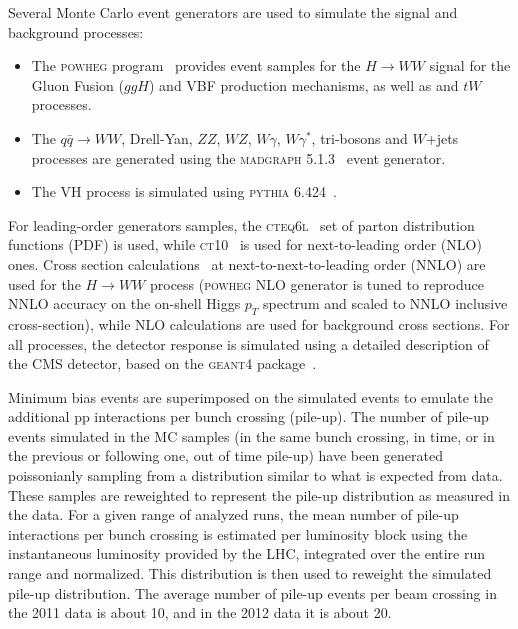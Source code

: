 Several Monte Carlo event generators are used to simulate the signal and background processes:
\begin{itemize}
\item The \textsc{powheg} program~\cite{powheg} provides event samples for the $H \rightarrow WW$ signal
for the Gluon Fusion ($ggH$) and VBF production mechanisms, as well as \ttbar and $tW$ processes.
\item The $q\bar{q} \to WW$, Drell-Yan, $ZZ$, $WZ$, $W\gamma$, $W\gamma^*$, tri-bosons and $W$+jets processes are generated using
the \textsc{madgraph 5.1.3}~\cite{madgraph} event generator.
\item The VH process is simulated using \textsc{pythia 6.424}~\cite{pythia}.
\end{itemize}
For leading-order generators samples, the \textsc{cteq6l}~\cite{cteq66} set of parton distribution functions
(PDF) is used, while \textsc{ct10}~\cite{ct10} is used for next-to-leading order (NLO) ones.
Cross section calculations~\cite{LHCHiggsCrossSectionWorkingGroup:2011ti} at next-to-next-to-leading order (NNLO) are used for the $H \rightarrow WW$ process (\textsc{powheg} NLO generator is tuned to reproduce NNLO accuracy on the on-shell Higgs $p_T$ spectrum and scaled to NNLO inclusive cross-section), while NLO calculations are used for background cross sections.
For all processes, the detector response is simulated using a detailed description of the CMS detector, based on the \textsc{geant4} package~\cite{Agostinelli:2002hh}.

Minimum bias events are superimposed on the simulated events to emulate the additional 
pp interactions per bunch crossing (pile-up). The number of pile-up events simulated in the MC samples
(in the same bunch crossing, in time, or in the previous or following one, out of time pile-up)
have been generated poissonianly sampling from a distribution similar to what
is expected from data. These samples are reweighted to represent the pile-up
distribution as measured in the data. For a given range of analyzed runs, the mean number of pile-up
interactions per bunch crossing is estimated per luminosity block using the instantaneous luminosity provided by
the LHC, integrated over the entire run range and normalized. This distribution
is then used to reweight the simulated pile-up distribution. 
The average number of pile-up events per beam crossing in the 2011 data is about 10, and in the 2012 data it is about 20.

